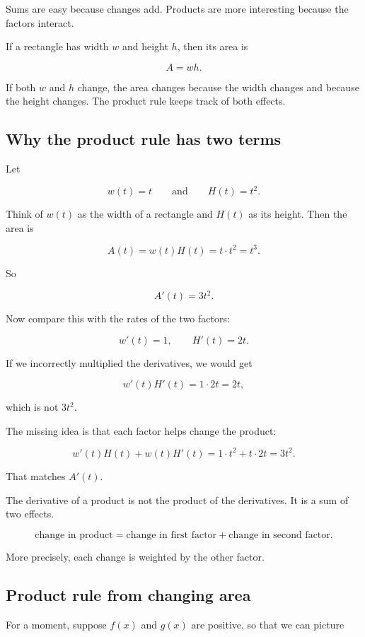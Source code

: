 Sums are easy because changes add.  Products are more interesting because the factors interact.

If a rectangle has width \(w\) and height \(h\), then its area is

\[
A=wh.
\]

If both \(w\) and \(h\) change, the area changes because the width changes and because the height changes.  The product rule keeps track of both effects.

\subsection{Why the product rule has two terms}
\label{subsec:why-product-rule-two-terms}

Let

\[
w(t)=t
\qquad\text{and}\qquad
H(t)=t^2.
\]

Think of \(w(t)\) as the width of a rectangle and \(H(t)\) as its height.  Then the area is

\[
A(t)=w(t)H(t)=t\cdot t^2=t^3.
\]

So

\[
A'(t)=3t^2.
\]

Now compare this with the rates of the two factors:

\[
w'(t)=1,
\qquad
H'(t)=2t.
\]

If we incorrectly multiplied the derivatives, we would get

\[
w'(t)H'(t)=1\cdot2t=2t,
\]

which is not \(3t^2\).

The missing idea is that each factor helps change the product:

\[
w'(t)H(t)+w(t)H'(t)
=
1\cdot t^2+t\cdot2t
=
3t^2.
\]

That matches \(A'(t)\).

The derivative of a product is not the product of the derivatives.  It is a sum of two effects.

\[
\boxed{
\text{change in product}
=
\text{change in first factor}
+
\text{change in second factor}.
}
\]

More precisely, each change is weighted by the other factor.

\subsection{Product rule from changing area}
\label{subsec:product-rule-area}

For a moment, suppose \(f(x)\) and \(g(x)\) are positive, so that we can picture

